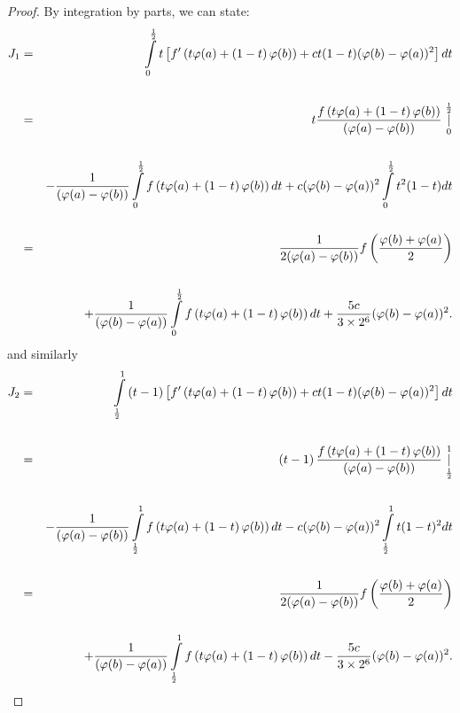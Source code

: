 \documentclass{amsart}
\theoremstyle{plain}
\numberwithin{equation}{section}
\begin{document}
\begin{proof}
By integration by parts, we can state:\begin{eqnarray}
J_{1} &=&\int\limits_{0}^{\frac{1}{2}}t\left[ f^{\prime }\left( t\varphi
(a)+\left( 1-t\right) \varphi (b)\right) +ct(1-t)(\varphi (b)-\varphi
(a))^{2}\right] dt  \notag \\
&&  \notag \\
&=&t\frac{f\left( t\varphi (a)+\left( 1-t\right) \varphi (b)\right) }{(\varphi (a)-\varphi (b))}\underset{0}{\overset{\frac{1}{2}}{\mid }}  \notag
\\
&&  \notag \\
&&-\frac{1}{(\varphi (a)-\varphi (b))}\int\limits_{0}^{\frac{1}{2}}f\left(
t\varphi (a)+\left( 1-t\right) \varphi (b)\right) dt+c(\varphi (b)-\varphi
(a))^{2}\int\limits_{0}^{\frac{1}{2}}t^{2}(1-t)dt  \label{3} \\
&&  \notag \\
&=&\frac{1}{2(\varphi (a)-\varphi (b))}f\left( \frac{\varphi (b)+\varphi (a)}{2}\right)   \notag \\
&&  \notag \\
&&+\frac{1}{(\varphi (b)-\varphi (a))}\int\limits_{0}^{\frac{1}{2}}f\left(
t\varphi (a)+\left( 1-t\right) \varphi (b)\right) dt+\frac{5c}{3\times 2^{6}}(\varphi (b)-\varphi (a))^{2}.  \notag
\end{eqnarray}and similarly\begin{eqnarray}
J_{2} &=&\int\limits_{\frac{1}{2}}^{1}\left( t-1\right) \left[ f^{\prime
}\left( t\varphi (a)+\left( 1-t\right) \varphi (b)\right) +ct(1-t)(\varphi
(b)-\varphi (a))^{2}\right] dt  \notag \\
&&  \notag \\
&=&\left( t-1\right) \frac{f\left( t\varphi (a)+\left( 1-t\right) \varphi
(b)\right) }{(\varphi (a)-\varphi (b))}\underset{\frac{1}{2}}{\overset{1}{\mid }}  \notag \\
&&  \notag \\
&&-\frac{1}{(\varphi (a)-\varphi (b))}\int\limits_{\frac{1}{2}}^{1}f\left(
t\varphi (a)+\left( 1-t\right) \varphi (b)\right) dt-c(\varphi (b)-\varphi
(a))^{2}\int\limits_{\frac{1}{2}}^{1}t(1-t)^{2}dt  \label{4} \\
&&  \notag \\
&=&\frac{1}{2(\varphi (a)-\varphi (b))}f\left( \frac{\varphi (b)+\varphi (a)}{2}\right)   \notag \\
&&  \notag \\
&&+\frac{1}{(\varphi (b)-\varphi (a))}\int\limits_{\frac{1}{2}}^{1}f\left(
t\varphi (a)+\left( 1-t\right) \varphi (b)\right) dt-\frac{5c}{3\times 2^{6}}(\varphi (b)-\varphi (a))^{2}.  \notag

\end{eqnarray}
\end{proof}
\end{document}
